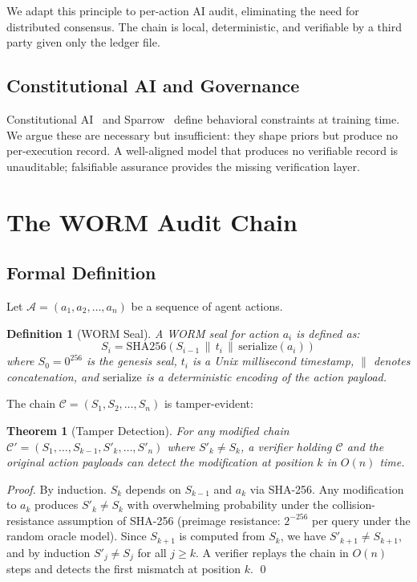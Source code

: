 \documentclass[12pt,letterpaper]{article}
\newtheorem{theorem}{Theorem}
\newtheorem{definition}{Definition}
\begin{document}
We adapt this principle to per-action AI audit, eliminating the need for
distributed consensus. The chain is local, deterministic, and verifiable by
a third party given only the ledger file.

\subsection{Constitutional AI and Governance}

Constitutional AI~\citep{bai2022constitutional} and Sparrow~\citep{glaese2022sparrow}
define behavioral constraints at training time. We argue these are necessary
but insufficient: they shape priors but produce no per-execution record.
A well-aligned model that produces no verifiable record is unauditable;
falsifiable assurance provides the missing verification layer.

\section{The WORM Audit Chain}
\label{sec:worm}

\subsection{Formal Definition}

Let $\mathcal{A} = (a_1, a_2, \ldots, a_n)$ be a sequence of agent actions.

\begin{definition}[WORM Seal]
A \emph{WORM seal} for action $a_i$ is defined as:
\[
  S_i = \mathrm{SHA256}\!\left(S_{i-1} \,\|\, t_i \,\|\, \mathrm{serialize}(a_i)\right)
\]
where $S_0 = 0^{256}$ is the genesis seal, $t_i$ is a Unix millisecond
timestamp, $\|$ denotes concatenation, and $\mathrm{serialize}$ is a
deterministic encoding of the action payload.
\end{definition}

The chain $\mathcal{C} = (S_1, S_2, \ldots, S_n)$ is tamper-evident:

\begin{theorem}[Tamper Detection]
\label{thm:tamper}
For any modified chain
$\mathcal{C}' = (S_1, \ldots, S_{k-1}, S'_k, \ldots, S'_n)$ where
$S'_k \neq S_k$, a verifier holding $\mathcal{C}$ and the original action
payloads can detect the modification at position $k$ in $O(n)$ time.
\end{theorem}

\begin{proof}
By induction. $S_k$ depends on $S_{k-1}$ and $a_k$ via SHA-256. Any
modification to $a_k$ produces $S'_k \neq S_k$ with overwhelming probability
under the collision-resistance assumption of SHA-256 (preimage resistance:
$2^{-256}$ per query under the random oracle model). Since $S_{k+1}$ is
computed from $S_k$, we have $S'_{k+1} \neq S_{k+1}$, and by induction
$S'_j \neq S_j$ for all $j \geq k$. A verifier replays the chain in $O(n)$
steps and detects the first mismatch at position $k$. \qed
\end{proof}
\end{document}
